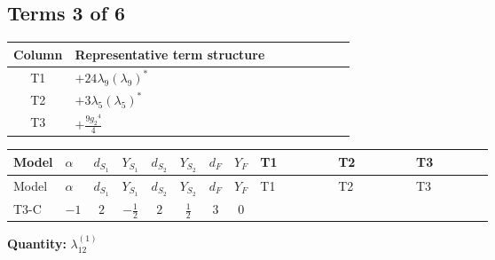 \documentclass[8pt]{article}
\begin{document}
\begin{landscape}
\subsection*{Terms 3 of 6}
\begin{center}
\begin{tabular}{@{}c >{\raggedright\arraybackslash}p{0.82\linewidth}@{}}
\toprule
Column & Representative term structure \\
\midrule
T1 & \(\displaystyle +24 {\lambda_{9}} \left({\lambda_{9}}\right)^{*}\) \\
\midrule
T2 & \(\displaystyle +3 {\lambda_5} \left({\lambda_5}\right)^{*}\) \\
\midrule
T3 & \(\displaystyle +\frac{9 {g_2}^4}{4}\) \\
\midrule
\bottomrule
\end{tabular}
\end{center}
\smallskip
\tiny
\begin{longtable}{@{}llcccccc >{\raggedright\arraybackslash}p{0.21\linewidth} >{\raggedright\arraybackslash}p{0.21\linewidth} >{\raggedright\arraybackslash}p{0.21\linewidth}@{}}
\toprule
Model & $\alpha$ & $d_{S_1}$ & $Y_{S_1}$ & $d_{S_2}$ & $Y_{S_2}$ & $d_F$ & $Y_F$ & T1 & T2 & T3 \\
\midrule
\endfirsthead
\toprule
Model & $\alpha$ & $d_{S_1}$ & $Y_{S_1}$ & $d_{S_2}$ & $Y_{S_2}$ & $d_F$ & $Y_F$ & T1 & T2 & T3 \\
\midrule
\endhead
T3-C & $-1$ & $2$ & $-\frac{1}{2}$ & $2$ & $\frac{1}{2}$ & $3$ & $0$ & \scriptsize\adjustbox{max width=\linewidth}{$\begin{gathered} +24 {\lambda_{9}} \left({\lambda_{9}}\right)^{*}\end{gathered}$} & \scriptsize\adjustbox{max width=\linewidth}{$\begin{gathered} +3 {\lambda_5} \left({\lambda_5}\right)^{*}\end{gathered}$} & \scriptsize\adjustbox{max width=\linewidth}{$\begin{gathered} +\frac{9 {g_2}^4}{4}\end{gathered}$} \\
\midrule
\bottomrule
\end{longtable}
\clearpage
\noindent\textbf{Quantity: }$\lambda_{12}^{(1)}$\par\smallskip

\end{landscape}
\end{document}
